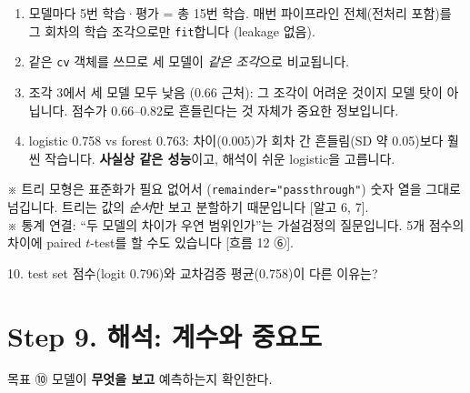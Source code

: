 \documentclass[11pt,a4paper]{article}
\newcommand{\code}[1]{\texttt{#1}}
\newcommand{\aside}[1]{{\footnotesize\color{black!65}#1}}
\begin{document}
\begin{howbox}
\begin{enumerate}
\item 모델마다 5번 학습·평가 = 총 15번 학습. 매번 파이프라인 전체(전처리 포함)를 그 회차의 학습 조각으로만 \code{fit}합니다 (leakage 없음).
\item 같은 \code{cv} 객체를 쓰므로 세 모델이 \emph{같은 조각}으로 비교됩니다.
\item 조각 3에서 세 모델 모두 낮음 (0.66 근처): 그 조각이 어려운 것이지 모델 탓이 아닙니다. 점수가 0.66–0.82로 흔들린다는 것 자체가 중요한 정보입니다.
\item logistic 0.758 vs forest 0.763: 차이(0.005)가 회차 간 흔들림(SD 약 0.05)보다 훨씬 작습니다. \textbf{사실상 같은 성능}이고, 해석이 쉬운 logistic을 고릅니다.
\end{enumerate}
\end{howbox}
\aside{※ 트리 모형은 표준화가 필요 없어서 (\code{remainder="passthrough"}) 숫자 열을 그대로 넘깁니다. 트리는 값의 \emph{순서}만 보고 분할하기 때문입니다 [알고 6, 7].}\\
\aside{※ 통계 연결: ``두 모델의 차이가 우연 범위인가''는 가설검정의 질문입니다. 5개 점수의 차이에 paired $t$-test를 할 수도 있습니다 [흐름 12 ⑥].}

\begin{qbox}
10. test set 점수(logit 0.796)와 교차검증 평균(0.758)이 다른 이유는?
\end{qbox}

\section{Step 9. 해석: 계수와 중요도}
\begin{goalbox}{목표 \quad ⑩}
모델이 \textbf{무엇을 보고} 예측하는지 확인한다.
\end{goalbox}
\end{document}
